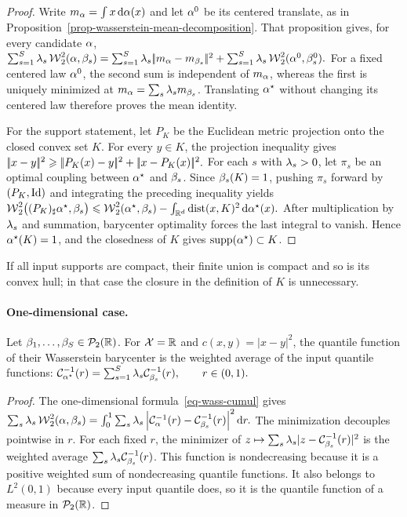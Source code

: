 \begin{proof}
Write $m_\alpha=\int x\,\mathrm{d}\alpha(x)$ and let $\alpha^0$ be its centered translate, as in Proposition~\ref{prop-wasserstein-mean-decomposition}. That proposition gives, for every candidate $\alpha$,
\(\sum_{s=1}^S\lambda_s\operatorname{\mathcal{W}}_2^2(\alpha,\beta_s) = \sum_{s=1}^S\lambda_s|\!| m_\alpha-m_{\beta_s} |\!|^2 +\sum_{s=1}^S\lambda_s\operatorname{\mathcal{W}}_2^2(\alpha^0,\beta_s^0).\)
For a fixed centered law $\alpha^0$, the second sum is independent of $m_\alpha$, whereas the first is uniquely minimized at
$m_\alpha=\sum_s\lambda_s m_{\beta_s}$. Translating $\alpha^\star$ without changing its centered law therefore proves the mean identity.

For the support statement, let $P_K$ be the Euclidean metric projection onto the closed convex set $K$. For every $y\in K$, the projection inequality gives \(|\!| x-y |\!|^2 \geqslant |\!| P_K(x)-y |\!|^2+|\!| x-P_K(x) |\!|^2.\)
For each $s$ with $\lambda_s>0$, let $\pi_s$ be an optimal coupling between $\alpha^\star$ and $\beta_s$. Since $\beta_s(K)=1$, pushing $\pi_s$ forward by $(P_K,\mathrm{Id})$ and integrating the preceding inequality yields
\(\operatorname{\mathcal{W}}_2^2\bigl((P_K)_\sharp\alpha^\star,\beta_s\bigr) \leqslant \operatorname{\mathcal{W}}_2^2(\alpha^\star,\beta_s) - \int_{\mathbb{R}^d}\operatorname{dist}(x,K)^2\,\mathrm{d}\alpha^\star(x).\)
After multiplication by $\lambda_s$ and summation, barycenter optimality forces the last integral to vanish. Hence $\alpha^\star(K)=1$, and the closedness of $K$ gives $\operatorname{supp}(\alpha^\star)\subset K$.
\end{proof}
If all input supports are compact, their finite union is compact and so is its convex hull; in that case the closure in the definition of $K$ is unnecessary.

\paragraph{One-dimensional case.}
\begin{prop}\label{prop-quantile-barycenters}
Let $\beta_1,\ldots,\beta_S\in\mathcal{P}_2(\mathbb{R})$. For $\mathcal{X}=\mathbb{R}$ and $c(x,y)=|x-y|^2$, the quantile function of their Wasserstein barycenter is the weighted average of the input quantile functions:
\(\mathcal{C}_{\alpha^\star}^{-1}(r) = \sum_{s=1}^S\lambda_s\mathcal{C}_{\beta_s}^{-1}(r), \qquad r\in(0,1).\)
\end{prop}
\begin{proof}
The one-dimensional formula~\eqref{eq-wass-cumul} gives \(\sum_s\lambda_s\operatorname{\mathcal{W}}_2^2(\alpha,\beta_s) = \int_0^1 \sum_s\lambda_s \left\lvert\mathcal{C}_{\alpha}^{-1}(r)-\mathcal{C}_{\beta_s}^{-1}(r)\right\rvert^2 \mathrm{d} r.\)
The minimization decouples pointwise in $r$. For each fixed $r$, the minimizer of $z\mapsto\sum_s\lambda_s|z-\mathcal{C}_{\beta_s}^{-1}(r)|^2$ is the weighted average $\sum_s\lambda_s\mathcal{C}_{\beta_s}^{-1}(r)$. This function is nondecreasing because it is a positive weighted sum of nondecreasing quantile functions. It also belongs to $L^2(0,1)$ because every input quantile does, so it is the quantile function of a measure in $\mathcal{P}_2(\mathbb{R})$.
\end{proof}
